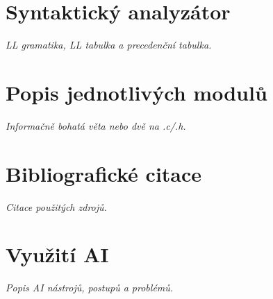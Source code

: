 \documentclass[12pt]{article}
\begin{document}
\newpage

\section{Syntaktický analyzátor}
\textit{LL gramatika, LL tabulka a precedenční tabulka.}

\newpage

\section{Popis jednotlivých modulů}
\textit{Informačně bohatá věta nebo dvě na .c/.h.}

\newpage

\section{Bibliografické citace}
\textit{Citace použitých zdrojů.}

\newpage

\section{Využití AI}
\textit{Popis AI nástrojů, postupů a problémů.}
\end{document}

